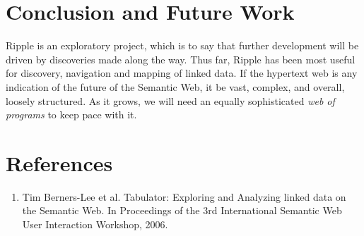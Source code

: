 \documentclass[runningheads]{llncs}
\begin{document}
\section{Conclusion and Future Work}
Ripple is an exploratory project, which is to say that further development will be driven by discoveries made along the way.  Thus far, Ripple has been most useful for discovery, navigation and mapping of linked data.  If the hypertext web is any indication of the future of the Semantic Web, it be vast, complex, and overall, loosely structured.  As it grows, we will need an equally sophisticated \textit{web of programs} to keep pace with it.

\section*{References}
\begin{enumerate}
\item Tim Berners-Lee et al. Tabulator: Exploring and Analyzing linked data on the Semantic Web. In Proceedings of the 3rd International Semantic Web User Interaction Workshop, 2006.
\end{enumerate}
\end{document}
